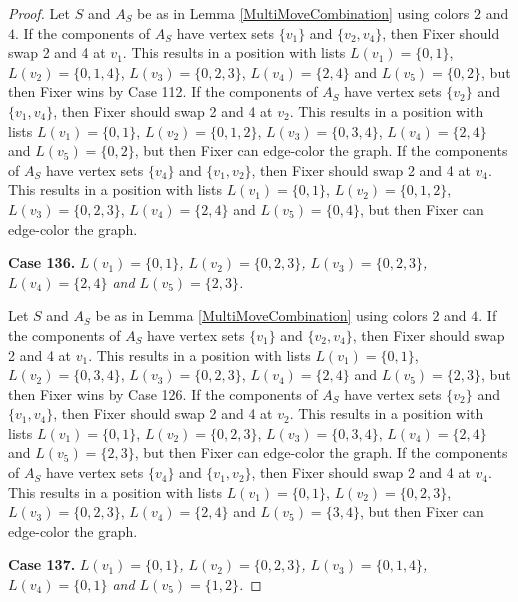 \documentclass[12pt]{amsart}
\theoremstyle{plain}
\theoremstyle{definition}
\theoremstyle{remark}
\begin{document}
\begin{proof}
Let $S$ and $A_S$ be as in Lemma \ref{MultiMoveCombination} using colors $2$ and $4$. If the components of $A_S$ have vertex sets $\{v_1\}$ and $\{v_2, v_4\}$, then Fixer should swap 2 and 4 at $v_1$. This results in a position with lists $L(v_1) = \{0, 1\}$, $L(v_2) = \{0, 1, 4\}$, $L(v_3) = \{0, 2, 3\}$, $L(v_4) = \{2, 4\}$ and $L(v_5) = \{0, 2\}$, but then Fixer wins by Case 112.
If the components of $A_S$ have vertex sets $\{v_2\}$ and $\{v_1, v_4\}$, then Fixer should swap 2 and 4 at $v_2$. This results in a position with lists $L(v_1) = \{0, 1\}$, $L(v_2) = \{0, 1, 2\}$, $L(v_3) = \{0, 3, 4\}$, $L(v_4) = \{2, 4\}$ and $L(v_5) = \{0, 2\}$, but then Fixer can edge-color the graph.
If the components of $A_S$ have vertex sets $\{v_4\}$ and $\{v_1, v_2\}$, then Fixer should swap 2 and 4 at $v_4$. This results in a position with lists $L(v_1) = \{0, 1\}$, $L(v_2) = \{0, 1, 2\}$, $L(v_3) = \{0, 2, 3\}$, $L(v_4) = \{2, 4\}$ and $L(v_5) = \{0, 4\}$, but then Fixer can edge-color the graph.

\noindent\textbf{Case 136.  }\textit{$L(v_1) = \{0, 1\}$, $L(v_2) = \{0, 2, 3\}$, $L(v_3) = \{0, 2, 3\}$, $L(v_4) = \{2, 4\}$ and $L(v_5) = \{2, 3\}$.}

Let $S$ and $A_S$ be as in Lemma \ref{MultiMoveCombination} using colors $2$ and $4$. If the components of $A_S$ have vertex sets $\{v_1\}$ and $\{v_2, v_4\}$, then Fixer should swap 2 and 4 at $v_1$. This results in a position with lists $L(v_1) = \{0, 1\}$, $L(v_2) = \{0, 3, 4\}$, $L(v_3) = \{0, 2, 3\}$, $L(v_4) = \{2, 4\}$ and $L(v_5) = \{2, 3\}$, but then Fixer wins by Case 126.
If the components of $A_S$ have vertex sets $\{v_2\}$ and $\{v_1, v_4\}$, then Fixer should swap 2 and 4 at $v_2$. This results in a position with lists $L(v_1) = \{0, 1\}$, $L(v_2) = \{0, 2, 3\}$, $L(v_3) = \{0, 3, 4\}$, $L(v_4) = \{2, 4\}$ and $L(v_5) = \{2, 3\}$, but then Fixer can edge-color the graph.
If the components of $A_S$ have vertex sets $\{v_4\}$ and $\{v_1, v_2\}$, then Fixer should swap 2 and 4 at $v_4$. This results in a position with lists $L(v_1) = \{0, 1\}$, $L(v_2) = \{0, 2, 3\}$, $L(v_3) = \{0, 2, 3\}$, $L(v_4) = \{2, 4\}$ and $L(v_5) = \{3, 4\}$, but then Fixer can edge-color the graph.

\noindent\textbf{Case 137.  }\textit{$L(v_1) = \{0, 1\}$, $L(v_2) = \{0, 2, 3\}$, $L(v_3) = \{0, 1, 4\}$, $L(v_4) = \{0, 1\}$ and $L(v_5) = \{1, 2\}$.}


\end{proof}
\end{document}
